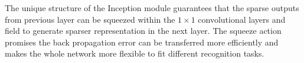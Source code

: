 
The unique structure of the Inception module guarantees that the sparse outputs from previous layer can be squeezed within the $1\times 1$ convolutional layers and field to generate sparser representation in the next layer. The squeeze action promises the back propagation error can be transferred more efficiently and makes the whole network more flexible to fit different recognition tasks.

